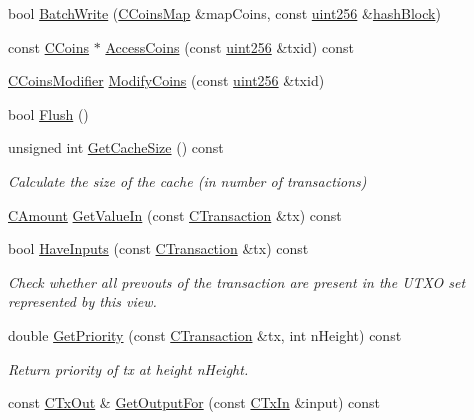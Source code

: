 \begin{DoxyCompactItemize}
\item 
bool \hyperlink{class_c_coins_view_cache_a561bb7c6c97701b12c48fbbb563d0a91}{Batch\+Write} (\hyperlink{coins_8h_a2886ba2fd0428bae777e1cbcabc02834}{C\+Coins\+Map} \&map\+Coins, const \hyperlink{classuint256}{uint256} \&\hyperlink{class_c_coins_view_cache_a229dddddbc5501edc250209a2ce5df8b}{hash\+Block})
\item 
const \hyperlink{class_c_coins}{C\+Coins} $\ast$ \hyperlink{class_c_coins_view_cache_a2b72aa925d9c1a1bd662f7e2852059d9}{Access\+Coins} (const \hyperlink{classuint256}{uint256} \&txid) const 
\item 
\hyperlink{class_c_coins_modifier}{C\+Coins\+Modifier} \hyperlink{class_c_coins_view_cache_ab67c0d489873ed735c4fc52aa66f0830}{Modify\+Coins} (const \hyperlink{classuint256}{uint256} \&txid)
\item 
bool \hyperlink{class_c_coins_view_cache_ac9888d4feaa46666d03871cd7cd1c01d}{Flush} ()
\item 
unsigned int \hyperlink{class_c_coins_view_cache_a5e8c37ab1b772d00b57e2b40256a4646}{Get\+Cache\+Size} () const 
\begin{DoxyCompactList}\small\item\em Calculate the size of the cache (in number of transactions) \end{DoxyCompactList}\item 
\hyperlink{amount_8h_a4eaf3a5239714d8c45b851527f7cb564}{C\+Amount} \hyperlink{class_c_coins_view_cache_a7fd5ad106e1ac2c2770005672421ff93}{Get\+Value\+In} (const \hyperlink{class_c_transaction}{C\+Transaction} \&tx) const 
\item 
bool \hyperlink{class_c_coins_view_cache_a2b547a48709e9f9af9a4cfc77a328a3f}{Have\+Inputs} (const \hyperlink{class_c_transaction}{C\+Transaction} \&tx) const 
\begin{DoxyCompactList}\small\item\em Check whether all prevouts of the transaction are present in the U\+T\+X\+O set represented by this view. \end{DoxyCompactList}\item 
double \hyperlink{class_c_coins_view_cache_a0ba6f2f115a73a91d3cfb8f59569099d}{Get\+Priority} (const \hyperlink{class_c_transaction}{C\+Transaction} \&tx, int n\+Height) const 
\begin{DoxyCompactList}\small\item\em Return priority of tx at height n\+Height. \end{DoxyCompactList}\item 
const \hyperlink{class_c_tx_out}{C\+Tx\+Out} \& \hyperlink{class_c_coins_view_cache_aa441d7d3869be2f164af1c52a3acb56a}{Get\+Output\+For} (const \hyperlink{class_c_tx_in}{C\+Tx\+In} \&input) const 
\end{DoxyCompactItemize}
